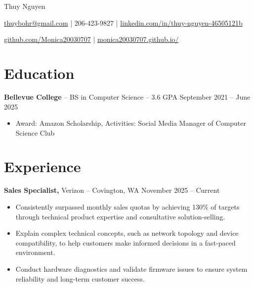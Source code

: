 \documentclass[11pt]{article}       %
\begin{document}
\centerline{\Huge Thuy Nguyen}

\vspace{5pt}

\centerline{\href{mailto:thuybohr@gmail.com}{thuybohr@gmail.com} | 206-423-9827 |
\href{https://www.linkedin.com/in/thuy-nguyen-46505121b/}{linkedin.com/in/thuy-nguyen-46505121b}}

\centerline{\href{https://github.com/Monica20030707}{github.com/Monica20030707} | 
\href{https://monica20030707.github.io/}{monica20030707.github.io/}} 

\vspace{-9pt}

\section*{Education}
\textbf{Bellevue College} -- BS in Computer Science -- 3.6 GPA \hfill September 2021 -- June 2025\\
\vspace{-9pt}
\begin{itemize}
  \item Award: Amazon Scholarship, Activities: Social Media Manager of Computer Science Club
\end{itemize}

\vspace{-18.5pt}

\section*{Experience}

\textbf{Sales Specialist,} {Verizon} -- Covington, WA \hfill November 2025 -- Current \\
\vspace{-9pt}
\begin{itemize}
  \item Consistently surpassed monthly sales quotas by achieving 130\% of targets through technical product expertise and consultative solution-selling.
  \item Explain complex technical concepts, such as network topology and device compatibility, to help customers make informed decisions in a fast-paced environment.
  \item Conduct hardware diagnostics and validate firmware issues to ensure system reliability and long-term customer success.
\end{itemize}
\end{document}
